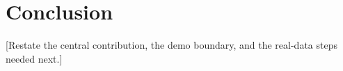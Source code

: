 \section{Conclusion}

[Restate the central contribution, the demo boundary, and the real-data steps needed next.]
